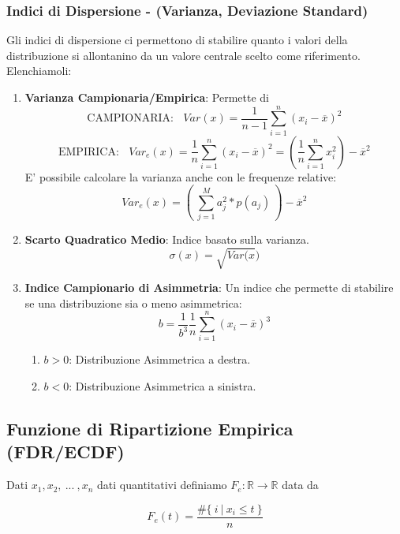 \documentclass{article}
\begin{document}
\newpage

\subsubsection{Indici di Dispersione - (Varianza, Deviazione Standard)}

Gli indici di dispersione ci permettono di stabilire quanto i valori della distribuzione si allontanino da un valore centrale scelto come riferimento.
Elenchiamoli:

\begin{enumerate}
    \item \textbf{Varianza Campionaria/Empirica}: Permette di 
    \[ \text{CAMPIONARIA:} \:\:\:\: Var(x) = \frac{1}{n-1} \sum^{n}_{i=1}(x_{i}-\overline{x})^{2} \]
    \[ \text{EMPIRICA:} \:\:\:\: Var_{e}(x) = \frac{1}{n} \sum^{n}_{i=1}(x_{i}-\overline{x})^{2} = (\frac{1}{n}\sum^{n}_{i=1}x^{2}_{i}) - \overline{x}^{2}\]
    \vspace*{5px}
    E' possibile calcolare la varianza anche con le frequenze relative:
    \[ Var_{e}(x) = (\:\sum_{j=1}^{M}a^{2}_{j} * p(a_{j})\:) - \overline{x}^{2}\]
    \item \textbf{Scarto Quadratico Medio}: Indice basato sulla varianza.
    \[ \sigma(x) = \sqrt{Var(x}) \]
    \item \textbf{Indice Campionario di Asimmetria}: Un indice che permette di stabilire se una distribuzione sia o meno asimmetrica:
    \[ b = \frac{1}{b^{3}}\frac{1}{n}\sum_{i=1}^{n}(x_{i}-\overline{x})^{3} \]
    \begin{enumerate}
        \item $b>0$: Distribuzione Asimmetrica a destra.
        \item $b<0$: Distribuzione Asimmetrica a sinistra.
    \end{enumerate}
\end{enumerate}

\subsection{Funzione di Ripartizione Empirica (FDR/ECDF)}

Dati $x_{1}, x_{2}, \: ... \:, x_{n}$ dati quantitativi definiamo $F_{e}:\mathbb{R} \xrightarrow{} \mathbb{R}$ data da

\vspace*{10px}

\[ \boxed{F_{e}(t) = \frac{\#\{ \: i \: | \:x_{i} \leq t \: \}}{n}} \]
\end{document}
